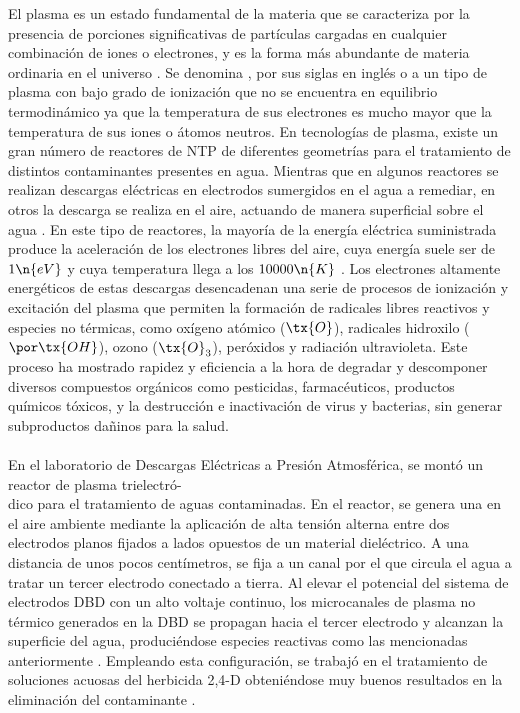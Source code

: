 El plasma es un estado fundamental de la materia que se caracteriza por la presencia de porciones significativas de partículas cargadas en cualquier combinación de iones o electrones, y es la forma más abundante de materia ordinaria en el universo . Se denomina , por sus siglas en inglés\txcurs{)} o  a un tipo de plasma con bajo grado de ionización que no se encuentra en equilibrio termodinámico ya que la temperatura de sus electrones es mucho mayor que la temperatura de sus iones o átomos neutros. En tecnologías de plasma, existe un gran número de reactores de NTP de diferentes geometrías para el tratamiento de distintos contaminantes presentes en agua. Mientras que en algunos reactores se realizan descargas eléctricas en electrodos sumergidos en el agua a remediar, en otros la descarga se realiza en el aire, actuando de manera superficial sobre el agua . En este tipo de reactores, la mayoría de la energía eléctrica suministrada produce la aceleración de los electrones libres del aire, cuya energía suele ser de $1 \n{eV}$ y cuya temperatura llega a los $10000 \n{K}$ . Los electrones altamente energéticos de estas descargas desencadenan una serie de procesos de ionización y excitación del plasma que permiten la formación de radicales libres reactivos y especies no térmicas, como oxígeno atómico ($\tx{O}$), radicales hidroxilo ($\por\tx{OH}$), ozono ($\tx{O}_3$), peróxidos y radiación ultravioleta. Este proceso ha mostrado rapidez y eficiencia a la hora de degradar y descomponer diversos compuestos orgánicos como pesticidas, farmacéuticos, productos químicos tóxicos, y la destrucción e inactivación de virus y bacterias, sin generar subproductos dañinos para la salud. \\\\
En el laboratorio de Descargas Eléctricas a Presión Atmosférica, se montó un reactor de plasma trielectró-\\ dico para el tratamiento de aguas contaminadas. En el reactor, se genera una  en el aire ambiente mediante la aplicación de alta tensión alterna entre dos electrodos planos fijados a lados opuestos de un material dieléctrico. A una distancia de unos pocos centímetros, se fija a un canal por el que circula el agua a tratar un tercer electrodo conectado a tierra. Al elevar el potencial del sistema de electrodos DBD con un alto voltaje continuo, los microcanales de plasma no térmico generados en la DBD se propagan hacia el tercer electrodo y alcanzan la superficie del agua, produciéndose especies reactivas como las mencionadas anteriormente . Empleando esta configuración, se trabajó en el tratamiento de soluciones acuosas del herbicida 2,4-D obteniéndose muy buenos resultados en la eliminación del contaminante . \\\\
